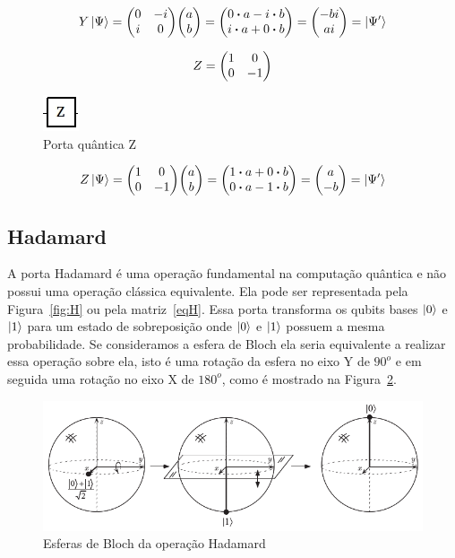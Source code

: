 \documentclass[a4paper, 12pt, oneside]{book}
\begin{document}
\begin{align*}
Y\ket{\Psi} = \mqty(0&-i\\i&0)\mqty(a\\b) = \mqty(0 \vdot a-i \vdot b \\i \vdot a+0 \vdot b) = \mqty(-bi\\ai) = \ket{\Psi'}
\end{align*}

\begin{equation}\label{eqZ}
Z =  \mqty(1&0\\0&-1)
\end{equation}

\begin{figure}[H]
\centering
\includegraphics[scale=0.75]{z.jpg}
\caption{Porta quântica Z}
\label{fig:z}
\end{figure}

\begin{align*}
Z\ket{\Psi} = \mqty(1&0\\0&-1)\mqty(a\\b) = \mqty(1 \vdot a+0 \vdot b \\0 \vdot a-1 \vdot b) = \mqty(a\\-b) = \ket{\Psi'}
\end{align*}

\subsection{Hadamard} 
A porta Hadamard é uma operação fundamental na computação quântica e não possui uma operação clássica equivalente. Ela pode ser representada pela Figura~\ref{fig:H} ou pela matriz~\eqref{eqH}. Essa porta transforma os qubits bases $\ket{0}$ e $\ket{1}$ para um estado de sobreposição onde $\ket{0}$ e $\ket{1}$ possuem a mesma probabilidade. Se consideramos a esfera de Bloch ela seria equivalente a realizar essa operação sobre ela, isto é uma rotação da esfera no eixo Y de $90^o$ e em seguida uma rotação no eixo X de $180^o$, como é mostrado na Figura~\ref{fig:h_sphere}.

\begin{figure}[H]
\centering
\includegraphics[scale=0.6]{h_sphere.png}
\caption{Esferas de Bloch da operação Hadamard}
\label{fig:h_sphere}
\end{figure}
\end{document}
